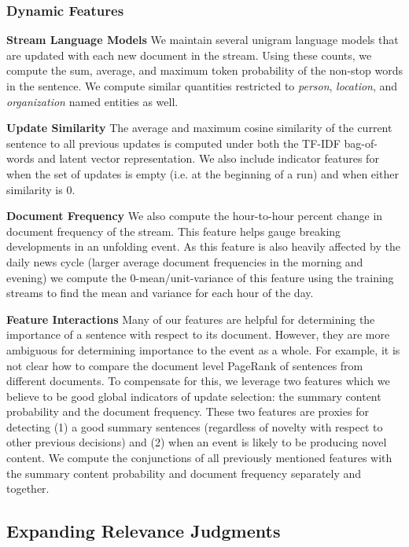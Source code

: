 \subsubsection{Dynamic Features}

\textbf{Stream Language Models} We maintain several unigram language models
that are updated with each new document in the stream. Using these counts, we
compute the sum, average, and maximum token probability of the non-stop words
in the sentence. We compute similar quantities restricted to \textit{person},
\textit{location}, and \textit{organization} named entities as well.

\textbf{Update Similarity} The average and maximum cosine similarity of the
current sentence to all previous updates is computed under both the TF-IDF
bag-of-words and latent vector representation. We also include indicator
features for when the set of updates is empty (i.e. at the beginning of a run)
and when either similarity is 0.

\textbf{Document Frequency} We also compute the hour-to-hour percent change in
document frequency of the stream. This feature helps gauge breaking
developments in an unfolding event. As this feature is also heavily affected by
the daily news cycle (larger average document frequencies in the morning and
evening) we compute the 0-mean/unit-variance of this feature using the training
streams to find the mean and variance for each hour of the day.

\textbf{Feature Interactions} Many of our features are helpful for determining
the importance of a sentence with respect to its document.  However, they are
more ambiguous for determining importance to the event as a whole. For example,
it is not clear how to compare the document level PageRank of sentences from
different documents. To compensate for this, we leverage two features which we
believe to be good global indicators of update selection: the summary content
probability and the document frequency.  These two features are proxies for
detecting (1) a good summary sentences (regardless of novelty with respect to
other previous decisions) and (2) when an event is likely to be producing novel
content. We compute the conjunctions of all previously mentioned features with
the summary content probability and document frequency separately and together.

\subsection{Expanding Relevance Judgments}
 \label{sec:reljudge}


